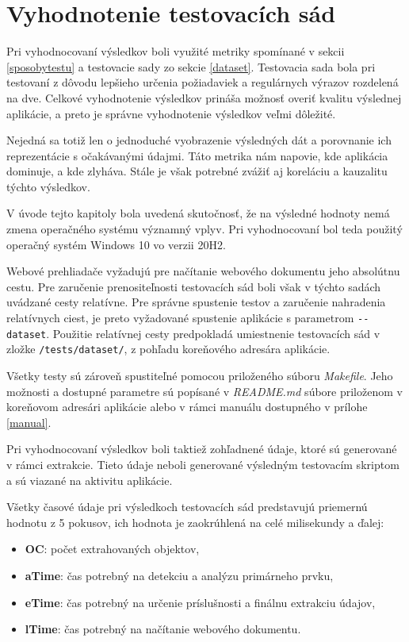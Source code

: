 \newpage

\section{Vyhodnotenie testovacích sád}

Pri vyhodnocovaní výsledkov boli využité metriky spomínané v sekcii \ref{sposobytestu} a testovacie sady zo sekcie \ref{dataset}. Testovacia sada  bola pri testovaní z dôvodu lepšieho určenia požiadaviek a regulárnych výrazov rozdelená na dve. Celkové vyhodnotenie výsledkov prináša možnosť overiť kvalitu výslednej aplikácie, a preto je správne vyhodnotenie výsledkov veľmi dôležité. 

Nejedná sa totiž len o jednoduché vyobrazenie výsledných dát a porovnanie ich reprezentácie s očakávanými údajmi. Táto metrika nám napovie, kde aplikácia dominuje, a kde zlyháva. Stále je však potrebné zvážiť aj koreláciu a kauzalitu týchto výsledkov. 

V úvode tejto kapitoly bola uvedená skutočnosť, že na výsledné hodnoty nemá zmena operačného systému významný vplyv. Pri vyhodnocovaní bol teda použitý operačný systém Windows 10 vo verzii 20H2.

Webové prehliadače vyžadujú pre načítanie webového dokumentu jeho absolútnu cestu. Pre zaručenie prenositeľnosti testovacích sád boli však v  týchto sadách uvádzané cesty relatívne. Pre správne spustenie testov a zaručenie nahradenia relatívnych ciest, je preto vyžadované spustenie aplikácie s parametrom \texttt{-{}-dataset}. Použitie relatívnej cesty predpokladá umiestnenie testovacích sád v zložke \texttt{/tests/dataset/}, z pohľadu koreňového adresára aplikácie.

Všetky testy sú zároveň spustiteľné pomocou priloženého súboru \textit{Makefile}. Jeho možnosti a dostupné parametre sú popísané v \textit{README.md} súbore priloženom v koreňovom adresári aplikácie alebo v rámci manuálu dostupného v prílohe \ref{manual}.

\bigskip

Pri vyhodnocovaní výsledkov boli taktiež zohľadnené údaje, ktoré sú generované v rámci extrakcie. Tieto údaje neboli generované výsledným testovacím skriptom a sú viazané na aktivitu aplikácie.

Všetky časové údaje pri výsledkoch testovacích sád predstavujú priemernú hodnotu z 5 pokusov, ich hodnota je zaokrúhlená na celé milisekundy a ďalej:

\begin{itemize}
    \item \textbf{OC}: počet extrahovaných objektov,
    \item \textbf{aTime}: čas potrebný na detekciu a analýzu primárneho prvku,
    \item \textbf{eTime}: čas potrebný na určenie príslušnosti a finálnu extrakciu údajov,
    \item \textbf{lTime}: čas potrebný na načítanie webového dokumentu.
\end{itemize}

